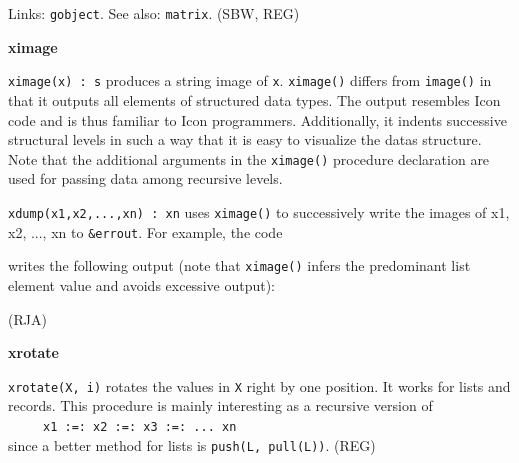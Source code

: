 Links: \texttt{gobject}. See also: \texttt{matrix}. (SBW, REG)

{\sffamily\bfseries
ximage}

\texttt{ximage(x) : s} produces a string image of \texttt{x}.
\texttt{ximage()} differs from \texttt{image()} in that it outputs all
elements of structured data types. The output
resembles Icon code and is thus familiar to Icon programmers.
Additionally, it indents successive structural levels in such a way
that it is easy to visualize the data{\textquotesingle}s structure.
Note that the additional arguments in the \texttt{ximage()} procedure
declaration are used for passing data among recursive levels. 

\texttt{xdump(x1,x2,...,xn) : xn} uses \texttt{ximage()} to successively
write the images of x1, x2, ..., xn to \texttt{\&errout}. For example,
the code


writes the following output (note that \texttt{ximage()} infers the
predominant list element value and avoids excessive output):


(RJA)

{\sffamily\bfseries
xrotate}

\texttt{xrotate(X, i)} rotates the values in \texttt{X} right by one
position. It works for lists and records. This procedure is mainly
interesting as a recursive version of\\
 \ \ \ \ \ \texttt{x1 :=: x2 :=: x3 :=: ... xn\\
}since a better method for lists is \texttt{push(L, pull(L))}. (REG)

